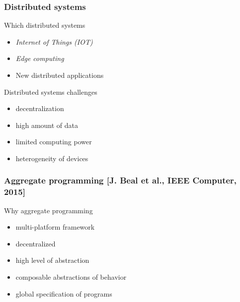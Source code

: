 

\maketitle

\begin{frame}
\frametitle{Distributed systems}
\begin{block}{Which distributed systems}
\begin{itemize}
\item \textit{Internet of Things (IOT)}
\item \textit{Edge computing}
\item New distributed applications
\end{itemize}
\end{block}
\begin{block}{Distributed systems challenges}
\begin{itemize}
\item decentralization
\item high amount of data
\item limited computing power
\item heterogeneity of devices
\end{itemize}
\end{block}
\end{frame}

\begin{frame}
\frametitle{Aggregate programming \small [J. Beal et al., IEEE Computer, 2015]}
\begin{block}{Why aggregate programming}
\begin{itemize}
\item multi-platform framework
\item decentralized
\item high level of abstraction
\item composable abstractions of behavior
\item global specification of programs
\end{itemize}
\end{block}
\end{frame}

